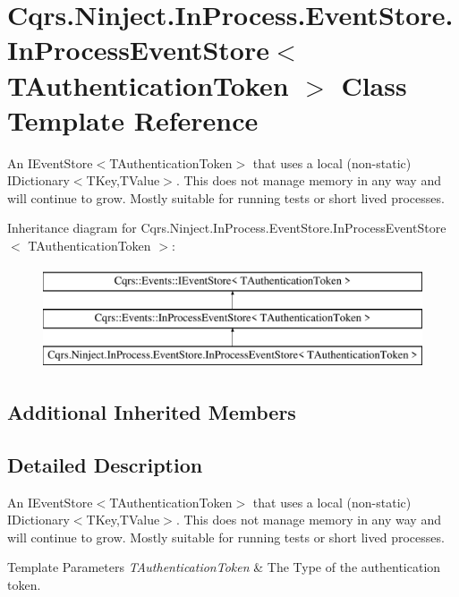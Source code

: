 \hypertarget{classCqrs_1_1Ninject_1_1InProcess_1_1EventStore_1_1InProcessEventStore}{}\section{Cqrs.\+Ninject.\+In\+Process.\+Event\+Store.\+In\+Process\+Event\+Store$<$ T\+Authentication\+Token $>$ Class Template Reference}
\label{classCqrs_1_1Ninject_1_1InProcess_1_1EventStore_1_1InProcessEventStore}


An I\+Event\+Store$<$\+T\+Authentication\+Token$>$ that uses a local (non-\/static) I\+Dictionary$<$\+T\+Key,\+T\+Value$>$. This does not manage memory in any way and will continue to grow. Mostly suitable for running tests or short lived processes.  


Inheritance diagram for Cqrs.\+Ninject.\+In\+Process.\+Event\+Store.\+In\+Process\+Event\+Store$<$ T\+Authentication\+Token $>$\+:\begin{figure}[H]
\begin{center}
\leavevmode
\includegraphics[height=3.000000cm]{classCqrs_1_1Ninject_1_1InProcess_1_1EventStore_1_1InProcessEventStore}
\end{center}
\end{figure}
\subsection*{Additional Inherited Members}


\subsection{Detailed Description}
An I\+Event\+Store$<$\+T\+Authentication\+Token$>$ that uses a local (non-\/static) I\+Dictionary$<$\+T\+Key,\+T\+Value$>$. This does not manage memory in any way and will continue to grow. Mostly suitable for running tests or short lived processes. 


\begin{DoxyTemplParams}{Template Parameters}
{\em T\+Authentication\+Token} & The Type of the authentication token.\\
\hline
\end{DoxyTemplParams}
